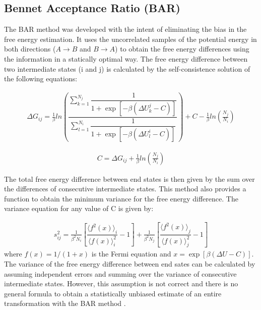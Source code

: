\subsection{Bennet Acceptance Ratio (BAR)}

The BAR method \cite{bennet1976} was developed with the intent of eliminating the bias in the free energy estimation. It uses the uncorrelated samples of the potential energy in both directions ($A \rightarrow B$ and $B \rightarrow A$) to obtain the free energy differences using the information in a statically optimal way. The free energy difference between two intermediate states (i and j) is calculated by the self-consistence solution of the following equations: 

\begin{equation}
\label{eq:bar1}
\begin{aligned}
\Delta G_{ij} = \frac{1}{\beta} ln \left( \dfrac{\sum_{k=1}^{N_{j}} \dfrac{1}{1+\exp[-\beta(\Delta U_{k}^{j}-C)]}}{\sum_{l=1}^{N_{i}} \dfrac{1}{1+\exp[-\beta(\Delta U_{l}^{i}-C)]}}\right) + C - \frac{1}{\beta}ln\left(\frac{N_{j}}{N_{i}}\right)
\end{aligned}
\end{equation}

\begin{equation}
\label{eq:bar2}
\begin{aligned}
 C = \Delta G_{ij} + \frac{1}{\beta}ln\left(\frac{N_{j}}{N_{i}}\right)
\end{aligned}
\end{equation}

The total free energy difference between end states is then given by the sum over the differences of consecutive intermediate states. This method also provides a function to obtain the minimum variance for the free energy difference. The variance equation for any value of C is given by:

\begin{equation}
\label{eq:barvar}
\begin{aligned}
 s_{ij}^{2} = \frac{1}{\beta^{2} N_{i}} \left[\dfrac{\langle{f^{2}(x)}\rangle_{i}}{\langle{f(x)}\rangle^{2}_{i}} - 1\right] + \frac{1}{\beta^{2} N_{j}} \left[\dfrac{\langle{f^{2}(x)}\rangle_{j}}{\langle{f(x)}\rangle^{2}_{j}} - 1\right]
\end{aligned}
\end{equation}
where $f(x)=1/(1+x)$ is the Fermi equation and $x=\exp[\beta(\Delta U - C)]$. The variance of the free energy difference between end sates can be calculated by assuming independent errors and summing over the variance of consecutive intermediate states. However, this assumption is not correct and there is no general formula to obtain a statistically unbiased estimate of an entire transformation with the BAR method \cite{bareva}. 

